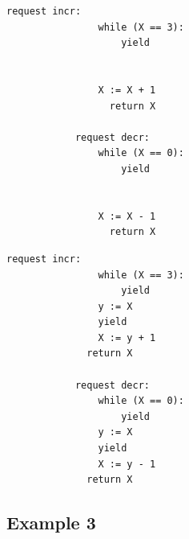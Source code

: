 \noindent
\begin{minipage}[t]{0.45\textwidth}
	\begin{lstlisting}[caption={Serializable},
		label={lst:FredSer}]
			request incr: 
			    while (X == 3):
			        yield
			        
			        
			    X := X + 1
				  return X		
			
			request decr: 
			    while (X == 0): 
			        yield
			        
			        
			    X := X - 1
				  return X
		\end{lstlisting}
\end{minipage}
\hfill
\begin{minipage}[t]{0.45\textwidth}
	\begin{lstlisting}[caption={Not serializable},
		label={lst:FredNonSer}]
			request incr:
			    while (X == 3):
			        yield
			    y := X
			    yield
			    X := y + 1
		      return X		
			
			request decr: 
			    while (X == 0):
			        yield
			    y := X
			    yield
			    X := y - 1
		      return X
		\end{lstlisting}
\end{minipage}
	
\subsection{Example 3}

